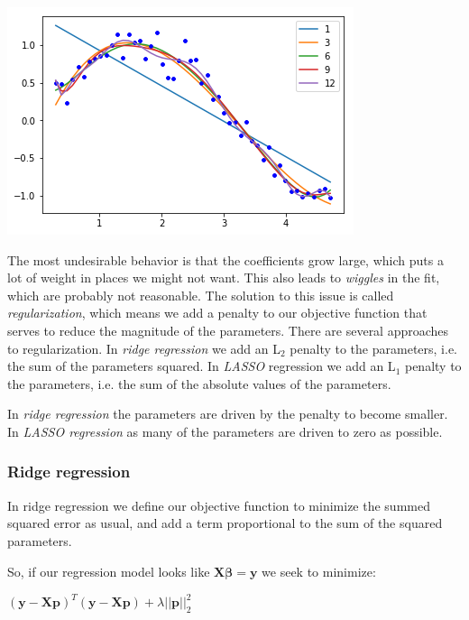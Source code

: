 \documentclass[11pt]{article}
\begin{document}
\begin{center}
\includegraphics[width=.9\linewidth]{obipy-resources/d00b1703e45a1bb2f86b06f32bba01b8-19673Qcp.png}
\end{center}

The most undesirable behavior is that the coefficients grow large, which puts a lot of weight in places we might not want. This also leads to \emph{wiggles} in the fit, which are probably not reasonable. The solution to this issue is called \emph{regularization}, which means we add a penalty to our objective function that serves to reduce the magnitude of the parameters. There are several approaches to regularization. In \emph{ridge regression} we add an L\(_{\text{2}}\) penalty to the parameters, i.e. the sum of the parameters squared. In \emph{LASSO} regression we add an L\(_{\text{1}}\) penalty to the parameters, i.e. the sum of the absolute values of the parameters.

In \emph{ridge regression} the parameters are driven by the penalty to become smaller. In \emph{LASSO regression} as many of the parameters are driven to zero as possible.

\subsubsection{Ridge regression}
\label{sec:orgdf4f3d5}

In ridge regression we define our objective function to minimize the summed squared error as usual, and add a term proportional to the sum of the squared parameters.

So, if our regression model looks like \(\mathbf{X} \mathbf{\beta} = \mathbf{y}\) we seek to minimize:

\((\mathbf{y} - \mathbf{X} \mathbf{p})^T (\mathbf{y} - \mathbf{X} \mathbf{p}) + \lambda ||\mathbf{p}||_2^2\)
\end{document}
